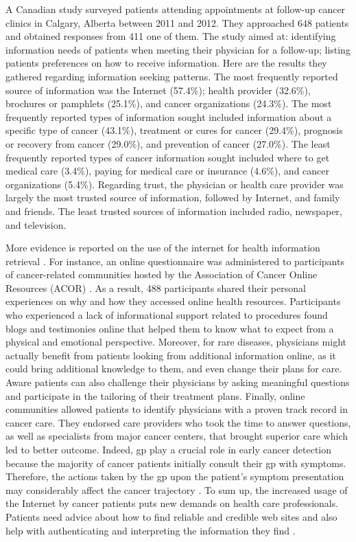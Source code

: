 A Canadian study surveyed patients attending appointments at follow-up cancer clinics in Calgary, Alberta \cite{sheabudgell_information_2014} between 2011 and 2012. They approached 648 patients and obtained responses from 411 one of them. The study aimed at: identifying information needs of patients when meeting their physician for a follow-up; listing patients preferences on how to receive information. Here are the results they gathered regarding information seeking patterns. The most frequently reported source of information was the Internet (57.4\%); health provider (32.6\%), brochures or pamphlets (25.1\%), and cancer organizations (24.3\%). The most frequently reported types of information sought included information about a specific type of cancer (43.1\%), treatment or cures for cancer (29.4\%), prognosis or recovery from cancer (29.0\%), and prevention of cancer (27.0\%). The least frequently reported types of cancer information sought included where to get medical care (3.4\%), paying for medical care or insurance (4.6\%), and cancer organizations (5.4\%). Regarding trust, the physician or health care provider was largely the most trusted source of information, followed by Internet, and family and friends. The least trusted sources of information included radio, newspaper, and television.

More evidence is reported on the use of the internet for health information retrieval \cite{chen_impact_2001,pereira_internet_2000,ziebland_how_2004,dolce_internet_2011}. For instance, an online questionnaire was administered to participants of cancer-related communities hosted by the Association of Cancer Online Resources (ACOR) \cite{dolce_internet_2011}. As a result, 488 participants shared their personal experiences on why and how they accessed online health resources. Participants who experienced a lack of informational support related to procedures found blogs and testimonies online that helped them to know what to expect from a physical and emotional perspective. Moreover, for rare diseases, physicians might actually benefit from patients looking from additional information online, as it could bring additional knowledge to them, and even change their plans for care. Aware patients can also challenge their physicians by asking meaningful questions and participate in the tailoring of their treatment plans. Finally, online communities allowed patients to identify physicians with a proven track record in cancer care. They endorsed care providers who took the time to answer questions, as well as specialists from major cancer centers, that brought superior care which led to better outcome. Indeed, \ac{gp} play a crucial role in early cancer detection because the majority of cancer patients initially consult their \ac{gp} with symptoms. Therefore, the actions taken by the \ac{gp} upon the patient's symptom presentation may considerably affect the cancer trajectory \cite{flytkjaer_virgilsen_cancer_2019}. To sum up, the increased usage of the Internet by cancer patients puts new demands on health care professionals. Patients need advice about how to find reliable and credible web sites and also help with authenticating and interpreting the information they find \cite{carlsson_cancer_2009}.

